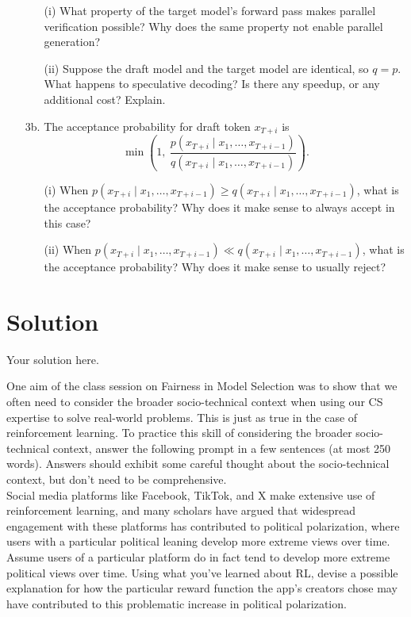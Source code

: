 \documentclass[submit]{../harvardml}
\newenvironment{solution}
  {\color{blue}\section*{Solution}}
{}
\begin{document}
\begin{framed}
\begin{enumerate}
  \begin{enumerate}
    \item[(i)] What property of the target model's forward pass makes parallel verification possible? Why does the same property not enable parallel generation?
    \item[(ii)] Suppose the draft model and the target model are identical, so $q = p$. What happens to speculative decoding? Is there any speedup, or any additional cost? Explain.
  \end{enumerate}
  
  \item[3b.] The acceptance probability for draft token $x_{T+i}$ is
  \[
  \min\!\left(1, \ \frac{p(x_{T+i} \mid x_1, \ldots, x_{T+i-1})}{q(x_{T+i} \mid x_1, \ldots, x_{T+i-1})}\right).
  \]
  
  \begin{enumerate}
    \item[(i)] When $p(x_{T+i} \mid x_1, \ldots, x_{T+i-1}) \geq q(x_{T+i} \mid x_1, \ldots, x_{T+i-1})$, what is the acceptance probability? Why does it make sense to always accept in this case?
    \item[(ii)] When $p(x_{T+i} \mid x_1, \ldots, x_{T+i-1}) \ll q(x_{T+i} \mid x_1, \ldots, x_{T+i-1})$, what is the acceptance probability? Why does it make sense to usually reject?
  \end{enumerate}
\end{enumerate}
\end{framed}

\newpage

\begin{solution}
	Your solution here.
\end{solution}

\newpage

\begin{problem}
    One aim of the class session on Fairness in Model Selection was to show that we often need to consider the broader socio-technical context when using our CS expertise to solve real-world problems. This is just as true in the case of reinforcement learning. To practice this skill of considering the broader socio-technical context, answer the following prompt in a few sentences (at most 250 words). Answers should exhibit some careful thought about the socio-technical context, but don't need to be comprehensive. \\

    \noindent Social media platforms like Facebook, TikTok, and X make extensive use of reinforcement learning, and many scholars have argued that widespread engagement with these platforms has contributed to political polarization, where users with a particular political leaning develop more extreme views over time. Assume users of a particular platform do in fact tend to develop more extreme political views over time. Using what you've learned about RL, devise a possible explanation for how the particular reward function the app's creators chose may have contributed to this problematic increase in political polarization.
\end{problem}
\end{document}

